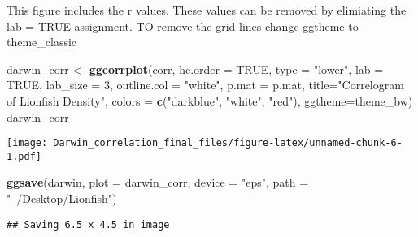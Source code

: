 \documentclass[]{article}
\newenvironment{Shaded}{\begin{snugshade}}{\end{snugshade}}
\newcommand{\KeywordTok}[1]{\textcolor[rgb]{0.13,0.29,0.53}{\textbf{#1}}}
\newcommand{\DataTypeTok}[1]{\textcolor[rgb]{0.13,0.29,0.53}{#1}}
\newcommand{\DecValTok}[1]{\textcolor[rgb]{0.00,0.00,0.81}{#1}}
\newcommand{\StringTok}[1]{\textcolor[rgb]{0.31,0.60,0.02}{#1}}
\newcommand{\OtherTok}[1]{\textcolor[rgb]{0.56,0.35,0.01}{#1}}
\newcommand{\NormalTok}[1]{#1}
\begin{document}
This figure includes the r values. These values can be removed by
elimiating the lab = TRUE assignment. TO remove the grid lines change
ggtheme to theme\_classic

\begin{Shaded}
\begin{Highlighting}[]
\NormalTok{darwin_corr <-}\StringTok{ }\KeywordTok{ggcorrplot}\NormalTok{(corr, }\DataTypeTok{hc.order =} \OtherTok{TRUE}\NormalTok{, }
           \DataTypeTok{type =} \StringTok{"lower"}\NormalTok{, }
           \DataTypeTok{lab =} \OtherTok{TRUE}\NormalTok{, }
           \DataTypeTok{lab_size =} \DecValTok{3}\NormalTok{, }\DataTypeTok{outline.col =} \StringTok{"white"}\NormalTok{,}
           \DataTypeTok{p.mat =}\NormalTok{ p.mat,}
           \DataTypeTok{title=}\StringTok{"Correlogram of Lionfish Density"}\NormalTok{, }
           \DataTypeTok{colors =} \KeywordTok{c}\NormalTok{(}\StringTok{"darkblue"}\NormalTok{, }\StringTok{"white"}\NormalTok{, }\StringTok{"red"}\NormalTok{),}
           \DataTypeTok{ggtheme=}\NormalTok{theme_bw)}
\NormalTok{darwin_corr}
\end{Highlighting}
\end{Shaded}

\texttt{[image: Darwin\_correlation\_final\_files/figure-latex/unnamed-chunk-6-1.pdf]}

\begin{Shaded}
\begin{Highlighting}[]
\KeywordTok{ggsave}\NormalTok{(darwin, }\DataTypeTok{plot =}\NormalTok{ darwin_corr, }\DataTypeTok{device =} \StringTok{"eps"}\NormalTok{, }\DataTypeTok{path =} \StringTok{"~/Desktop/Lionfish"}\NormalTok{)}
\end{Highlighting}
\end{Shaded}

\begin{verbatim}
## Saving 6.5 x 4.5 in image
\end{verbatim}
\end{document}
